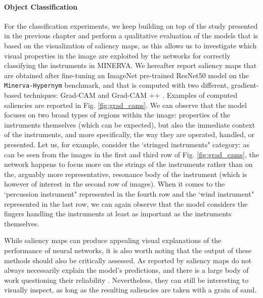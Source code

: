 \paragraph{Object Classification}
For the classification experiments, we keep building on top of the study presented in the previous chapter and perform a qualitative evaluation of the models that is based on the visualization of saliency maps, as this allows us to investigate which visual properties in the image are exploited by the networks for correctly classifying the instruments in MINERVA. We hereafter report saliency maps that are obtained after fine-tuning an ImageNet pre-trained ResNet50 model on the \texttt{Minerva-Hypernym} benchmark, and that is computed with two different, gradient-based techniques: Grad-CAM \cite{selvaraju2017grad} and Grad-CAM ++ \cite{chattopadhay2018grad}. Examples of computed saliencies are reported in Fig. \ref{fig:grad_cams}. We can observe that the model focuses on two broad types of regions within the image: properties of the instruments themselves (which can be expected), but also the immediate context of the instruments, and more specifically, the way they are operated, handled, or presented. Let us, for example, consider the `stringed instruments" category: as can be seen from the images in the first and third row of Fig. \ref{fig:grad_cams}, the network happens to focus more on the strings of the instruments rather than on the, arguably more representative, resonance body of the instrument (which is however of interest in the second row of images). When it comes to the `percussion instrument" represented in the fourth row and the `wind instrument" represented in the last row, we can again observe that the model considers the fingers handling the instruments at least as important as the instruments themselves.  

While saliency maps can produce appealing visual explanations of the performance of neural networks, it is also worth noting that the output of these methods should also be critically assessed. As reported by \citet{alqaraawi2020evaluating} saliency maps do not always necessarily explain the model's predictions, and there is a large body of work questioning their reliability \cite{simonyan2013deep,arun2020assessing,saporta2021deep}. Nevertheless, they can still be interesting to visually inspect, as long as the resulting saliencies are taken with a grain of sand. 

